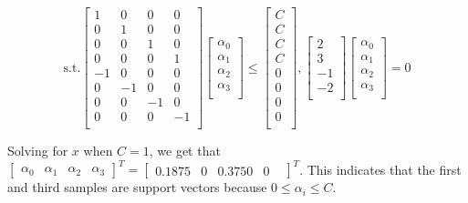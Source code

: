 \documentclass{article}
\begin{document}
$$\text{s.t.}
\begin{bmatrix}
  1 & 0 & 0 & 0 \\
  0 & 1 & 0 & 0 \\
  0 & 0 & 1 & 0 \\
  0 & 0 & 0 & 1 \\
  -1 & 0 & 0 & 0 \\
  0 & -1 & 0 & 0 \\
  0 & 0 & -1 & 0 \\
  0 & 0 & 0 & -1 \\
\end{bmatrix}
\begin{bmatrix}
  \alpha_0 \\
  \alpha_1 \\
  \alpha_2 \\
  \alpha_3 \\
\end{bmatrix}
\leq
\begin{bmatrix}
  C \\
  C \\
  C \\
  C \\
  0 \\
  0 \\
  0 \\
  0 \\
\end{bmatrix},
\begin{bmatrix}
  2 \\
  3 \\
  -1 \\
  -2 \\
\end{bmatrix}
\begin{bmatrix}
  \alpha_0 \\
  \alpha_1 \\
  \alpha_2 \\
  \alpha_3 \\
\end{bmatrix}
= 0 $$

Solving for $x$ when $C=1$, we get that $
\begin{bmatrix}
  \alpha_0 & \alpha_1 & \alpha_2 & \alpha_3
\end{bmatrix}^T
=
\begin{bmatrix}
  0.1875 & 0 & 0.3750 & 0 &
\end{bmatrix}^T
$. This indicates that the first and third samples are support vectors because $0 \leq \alpha_i \leq C$. \\
\end{document}
